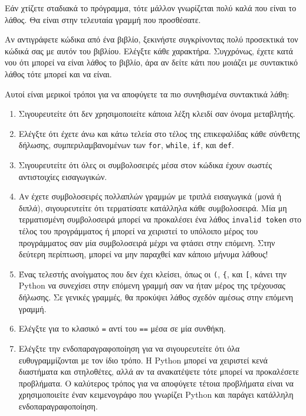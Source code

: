 \documentclass[10pt]{book}
\begin{document}
Εάν χτίζετε σταδιακά το πρόγραμμα, τότε μάλλον γνωρίζεται πολύ καλά που είναι το λάθος. Θα είναι στην 
τελευταία γραμμή που προσθέσατε.

Αν αντιγράφετε κώδικα από ένα βιβλίο, ξεκινήστε συγκρίνοντας πολύ προσεκτικά τον κώδικά σας με 
αυτόν του βιβλίου.  Ελέγξτε κάθε χαρακτήρα.  Συγχρόνως, έχετε κατά νου ότι μπορεί να είναι λάθος το 
βιβλίο, άρα αν δείτε κάτι που μοιάζει με συντακτικό λάθος τότε μπορεί και να είναι.

Αυτοί είναι μερικοί τρόποι για να αποφύγετε τα πιο συνηθισμένα συντακτικά λάθη:

\begin{enumerate}

\item  Σιγουρευτείτε ότι δεν χρησιμοποιείτε κάποια λέξη κλειδί σαν όνομα μεταβλητής. 

\item  Ελέγξτε ότι έχετε άνω και κάτω τελεία στο τέλος της επικεφαλίδας κάθε σύνθετης 
δήλωσης, συμπεριλαμβανομένων των {\tt for}, {\tt while}, {\tt if}, και {\tt def}.

\item  Σιγουρευτείτε ότι όλες οι συμβολοσειρές μέσα στον κώδικα έχουν σωστές αντιστοιχίες εισαγωγικών. 

\item  Αν έχετε συμβολοσειρές πολλαπλών γραμμών με τριπλά εισαγωγικά (μονά ή διπλά), σιγουρευτείτε ότι
τερματίσατε κατάλληλα κάθε συμβολοσειρά.  Μία μη τερματισμένη συμβολοσειρά μπορεί να προκαλέσει ένα λάθος
{\tt invalid token} στο τέλος του προγράμματος ή μπορεί να χειριστεί το υπόλοιπο μέρος του προγράμματος
σαν μία συμβολοσειρά μέχρι να φτάσει στην επόμενη.  Στην δεύτερη περίπτωση, μπορεί να μην παραχθεί καν 
κάποιο μήνυμα λάθους!

\item  Ένας τελεστής ανοίγματος που δεν έχει κλείσει, όπως οι \verb+(+, \verb+{+,  
και \verb+[+, κάνει την Python να συνεχίσει στην επόμενη γραμμή σαν να ήταν    
μέρος της τρέχουσας δήλωσης.  Σε γενικές γραμμές, θα προκύψει λάθος σχεδόν αμέσως στην 
επόμενη γραμμή. 

\item  Ελέγξτε για το κλασικό {\tt =} αντί του {\tt ==} μέσα σε μία συνθήκη. 

\item  Ελέγξτε την ενδοπαραγραφοποίηση για να σιγουρευτείτε ότι όλα ευθυγραμμίζονται με τον ίδιο τρόπο.
Η Python μπορεί να χειριστεί κενά διαστήματα και στηλοθέτες, αλλά αν τα ανακατέψετε τότε μπορεί να προκαλέσετε
προβλήματα.  Ο καλύτερος τρόπος για να αποφύγετε τέτοια προβλήματα είναι να χρησιμοποιείτε έναν κειμενογράφο
που γνωρίζει Python και παράγει κατάλληλη ενδοπαραγραφοποίηση. 

\end{enumerate}
\end{document}
